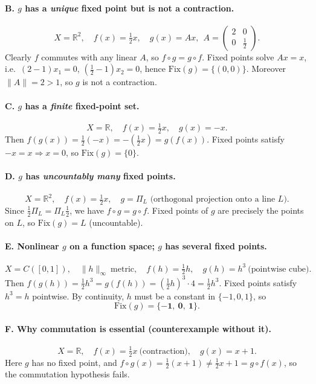 \documentclass[12pt,a4paper]{article}
\theoremstyle{plain}
\theoremstyle{definition}
\theoremstyle{remark}
\theoremstyle{remark}
\begin{document}
\paragraph{B. $g$ has a \emph{unique} fixed point but is not a contraction.}
\[
X=\mathbb{R}^2,\quad f(x)=\tfrac12 x,\quad 
g(x)=Ax,\ \ A=\begin{pmatrix}2&0\\[2pt]0&\tfrac12\end{pmatrix}.
\]
Clearly $f$ commutes with any linear $A$, so $f\circ g=g\circ f$.  
Fixed points solve $Ax=x$, i.e.\ $(2-1)x_1=0$, $(\tfrac12-1)x_2=0$, hence $\mathrm{Fix}(g)=\{(0,0)\}$.
Moreover $\|A\|=2>1$, so $g$ is not a contraction.

\paragraph{C. $g$ has a \emph{finite} fixed-point set.}
\[
X=\mathbb{R},\quad f(x)=\tfrac12 x,\quad g(x)=-x.
\]
Then $f(g(x))=\tfrac12(-x)=-(\tfrac12 x)=g(f(x))$.  
Fixed points satisfy $-x=x\Rightarrow x=0$, so $\mathrm{Fix}(g)=\{0\}$.

\paragraph{D. $g$ has \emph{uncountably many} fixed points.}
\[
X=\mathbb{R}^2,\quad f(x)=\tfrac12 x,\quad g=\Pi_L \text{ (orthogonal projection onto a line $L$).}
\]
Since $\tfrac12\Pi_L=\Pi_L\tfrac12$, we have $f\circ g=g\circ f$.  
Fixed points of $g$ are precisely the points on $L$, so $\mathrm{Fix}(g)=L$ (uncountable).

\paragraph{E. Nonlinear $g$ on a function space; $g$ has several fixed points.}
\[
X=C([0,1]),\quad \|h\|_\infty\ \text{metric},\quad f(h)=\tfrac12 h,\quad g(h)=h^3\ \text{(pointwise cube)}.
\]
Then $f(g(h))=\tfrac12 h^3=g(f(h))=(\tfrac12 h)^3\cdot 4=\tfrac12 h^3$.  
Fixed points satisfy $h^3=h$ pointwise. By continuity, $h$ must be a constant in $\{-1,0,1\}$, so
\[
\mathrm{Fix}(g)=\{-\mathbf{1},\ \mathbf{0},\ \mathbf{1}\}.
\]

\paragraph{F. Why commutation is essential (counterexample without it).}
\[
X=\mathbb{R},\quad f(x)=\tfrac12 x\ \text{(contraction)},\quad g(x)=x+1.
\]
Here $g$ has no fixed point, and $f\circ g(x)=\tfrac12(x+1)\neq \tfrac12 x+1=g\circ f(x)$, so the
commutation hypothesis fails.
\end{document}
